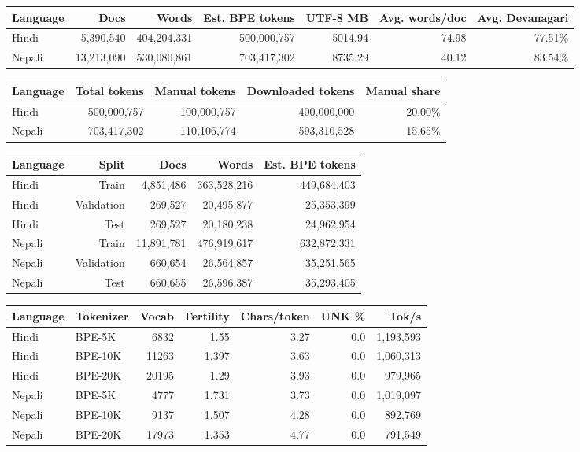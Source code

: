 \begin{tabular}{lrrrrrr}
\toprule
Language & Docs & Words & Est. BPE tokens & UTF-8 MB & Avg. words/doc & Avg. Devanagari \\
\midrule
Hindi & 5,390,540 & 404,204,331 & 500,000,757 & 5014.94 & 74.98 & 77.51\% \\
Nepali & 13,213,090 & 530,080,861 & 703,417,302 & 8735.29 & 40.12 & 83.54\% \\
\bottomrule
\end{tabular}

\begin{tabular}{lrrrr}
\toprule
Language & Total tokens & Manual tokens & Downloaded tokens & Manual share \\
\midrule
Hindi & 500,000,757 & 100,000,757 & 400,000,000 & 20.00\% \\
Nepali & 703,417,302 & 110,106,774 & 593,310,528 & 15.65\% \\
\bottomrule
\end{tabular}

\begin{tabular}{lrrrr}
\toprule
Language & Split & Docs & Words & Est. BPE tokens \\
\midrule
Hindi & Train & 4,851,486 & 363,528,216 & 449,684,403 \\
Hindi & Validation & 269,527 & 20,495,877 & 25,353,399 \\
Hindi & Test & 269,527 & 20,180,238 & 24,962,954 \\
Nepali & Train & 11,891,781 & 476,919,617 & 632,872,331 \\
Nepali & Validation & 660,654 & 26,564,857 & 35,251,565 \\
Nepali & Test & 660,655 & 26,596,387 & 35,293,405 \\
\bottomrule
\end{tabular}

\begin{tabular}{llrrrrr}
\toprule
Language & Tokenizer & Vocab & Fertility & Chars/token & UNK \% & Tok/s \\
\midrule
Hindi & BPE-5K & 6832 & 1.55 & 3.27 & 0.0 & 1,193,593 \\
Hindi & BPE-10K & 11263 & 1.397 & 3.63 & 0.0 & 1,060,313 \\
Hindi & BPE-20K & 20195 & 1.29 & 3.93 & 0.0 & 979,965 \\
Nepali & BPE-5K & 4777 & 1.731 & 3.73 & 0.0 & 1,019,097 \\
Nepali & BPE-10K & 9137 & 1.507 & 4.28 & 0.0 & 892,769 \\
Nepali & BPE-20K & 17973 & 1.353 & 4.77 & 0.0 & 791,549 \\
\bottomrule
\end{tabular}

